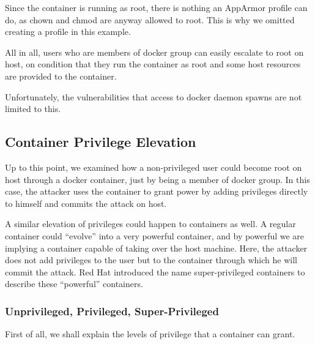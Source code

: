 Since the container is running as root, there is nothing an AppArmor profile can do, as chown and chmod are anyway allowed to root. This is why we omitted creating a profile in this example.

All in all, users who are members of docker group can easily escalate to root on host, on condition that they run the container as root and some host resources are provided to the container.

Unfortunately, the vulnerabilities that access to docker daemon spawns are not limited to this.

\subsection{Container Privilege Elevation}
Up to this point, we examined how a non-privileged user could become root on host through a docker container, just by being a member of docker group. In this case, the attacker uses the container to grant power by adding privileges directly to himself and commits the attack on host.

A similar elevation of privileges could happen to containers as well. A regular container could “evolve” into a very powerful container, and by powerful we are implying a container capable of taking over the host machine. Here, the attacker does not add privileges to the user but to the container through which he will commit the attack. Red Hat introduced the name super-privileged containers to describe these “powerful” containers. 

\subsubsection{Unprivileged, Privileged, Super-Privileged}
First of all, we shall explain the levels of privilege that a container can grant. 

